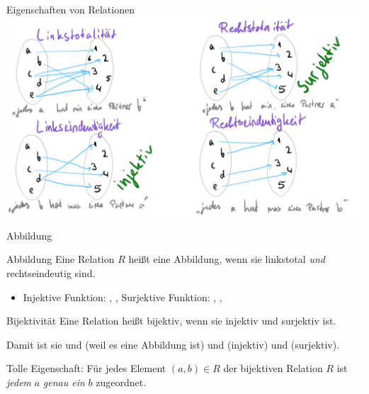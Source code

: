 \ifdefined\printmode
\begin{frame}{Eigenschaften von Relationen}
	\includegraphics[width=\linewidth]{images/mengen_alle.png}
\end{frame}
\fi

\begin{frame}{Abbildung}
	\pause
	\begin{block}{Abbildung}
		Eine Relation $R$ heißt eine Abbildung, wenn sie linkstotal \emph{und} rechtseindeutig sind.
	\end{block}\pause
	
	\begin{itemize}
		\item Injektive Funktion: \pause {}, , 
		\pitem Surjektive Funktion: \pause {}, , 
	\end{itemize}
	
	\pause
	
	\begin{block}{Bijektivität}
		Eine Relation heißt bijektiv, wenn sie injektiv und surjektiv ist.
	\end{block}
	
	\pause
	
	Damit ist sie  und  (weil es eine Abbildung ist) und  (injektiv) und  (surjektiv).
	
	\pause Tolle Eigenschaft: \pause Für jedes Element $(a, b) \in R$ der bijektiven Relation $R$ ist \emph{jedem} $a$ \emph{genau ein} $b$ zugeordnet. 
	
\end{frame}


